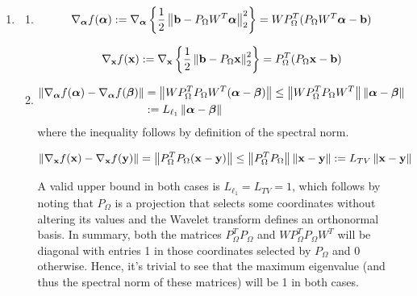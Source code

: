 \documentclass{article}
\begin{document}
\begin{enumerate}[label=2.\arabic*]
    \item 
    \begin{enumerate}[label=\alph*)]
        \item 
        \begin{align}
            \nabla_{\boldsymbol{\alpha}}f(\boldsymbol{\alpha}) :=\nabla_{\boldsymbol{\alpha}} \left\lbrace \frac{1}{2}\left\lVert\mathbf{b} - P_{\Omega} W^T \boldsymbol{\alpha}\right\rVert_2^2 \right\rbrace = W P_{\Omega}^T (P_{\Omega} W^T \boldsymbol{\alpha} - \mathbf{b})
        \end{align}
        
        \begin{align}
            \nabla_{\mathbf{x}}f(\mathbf{x}) := \nabla_{\mathbf{x}} \left\lbrace \frac{1}{2}\left\lVert\mathbf{b} - P_{\Omega} \mathbf{x}\right\rVert_2^2 \right\rbrace = P_{\Omega}^T (P_{\Omega} \mathbf{x} - \mathbf{b}) 
        \end{align}
        \item 
        \begin{align}
            \left\lVert\nabla_{\boldsymbol{\alpha}}f(\boldsymbol{\alpha}) - \nabla_{\boldsymbol{\alpha}}f(\boldsymbol{\beta})\right\rVert &= \left\lVert W P_{\Omega}^T P_{\Omega} W^T(\boldsymbol{\alpha} - \boldsymbol{\beta})\right\rVert \leq \left\lVert W P_{\Omega}^T P_{\Omega} W^T\right\rVert \left\lVert\boldsymbol{\alpha} - \boldsymbol{\beta}\right\rVert \\
            &:= L_{\ell_1} \left\lVert\boldsymbol{\alpha} - \boldsymbol{\beta}\right\rVert
        \end{align}
        where the inequality follows by definition of the spectral norm. 
        
        \begin{align}
            \left\lVert\nabla_{\mathbf{x}} f(\mathbf{x}) - \nabla_{\mathbf{x}} f(\mathbf{y})\right\rVert = \left\lVert P_{\Omega} ^TP_{\Omega} (\mathbf{x} - \mathbf{y})\right\rVert \leq \left\lVert P_{\Omega} ^TP_{\Omega}\right\rVert\left\lVert\mathbf{x} - \mathbf{y}\right\rVert := L_{TV}\left\lVert\mathbf{x} - \mathbf{y}\right\rVert
        \end{align}
    
    A valid upper bound in both cases is $L_{\ell_1}=L_{TV}=1$, which follows by noting that $P_{\Omega}$ is a projection that selects some coordinates without altering its values and the Wavelet transform defines an orthonormal basis. In summary, both the matrices $P_{\Omega}^T P_{\Omega}$ and $W P_{\Omega}^T P_{\Omega} W^T$ will be diagonal with entries 1 in those coordinates selected by $P_{\Omega}$ and 0 otherwise. Hence, it's trivial to see that the maximum eigenvalue (and thus the spectral norm of these matrices) will be 1 in both cases.
    \end{enumerate}
    

\end{enumerate}
\end{document}
